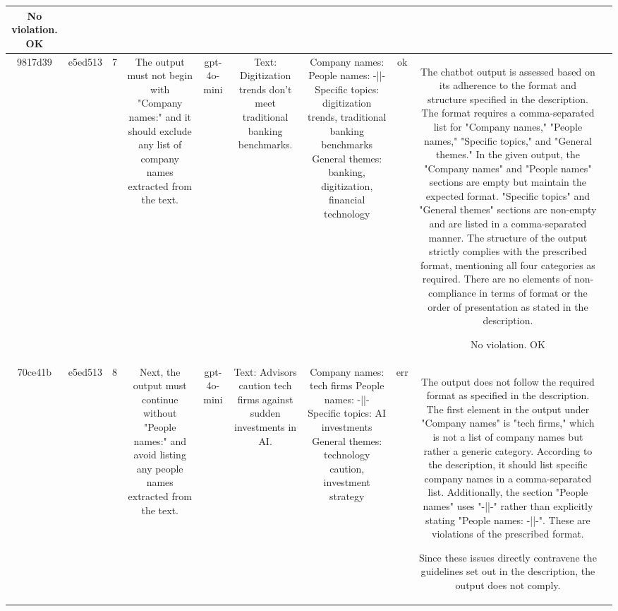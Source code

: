 \begin{table}[h!]
\begin{tabular}{|c|c|c|c|c|c|c|c|c|c|}
No violation.
OK & \\
\hline
9817d39 & e5ed513 & 7 & The output must not begin with "Company names:" and it should exclude any list of company names extracted from the text. & gpt-4o-mini & Text: Digitization trends don't meet traditional banking benchmarks. & Company names: 
People names: -||-
Specific topics: digitization trends, traditional banking benchmarks
General themes: banking, digitization, financial technology & ok & The chatbot output is assessed based on its adherence to the format and structure specified in the description. The format requires a comma-separated list for "Company names," "People names," "Specific topics," and "General themes." In the given output, the "Company names" and "People names" sections are empty but maintain the expected format. "Specific topics" and "General themes" sections are non-empty and are listed in a comma-separated manner. The structure of the output strictly complies with the prescribed format, mentioning all four categories as required. There are no elements of non-compliance in terms of format or the order of presentation as stated in the description.

No violation.
OK & \\
\hline
70ce41b & e5ed513 & 8 & Next, the output must continue without "People names:" and avoid listing any people names extracted from the text. & gpt-4o-mini & Text: Advisors caution tech firms against sudden investments in AI. & Company names: tech firms
People names: -||-
Specific topics: AI investments
General themes: technology caution, investment strategy & err & The output does not follow the required format as specified in the description. The first element in the output under "Company names" is "tech firms," which is not a list of company names but rather a generic category. According to the description, it should list specific company names in a comma-separated list. Additionally, the section "People names" uses "-||-" rather than explicitly stating "People names: -||-". These are violations of the prescribed format.

Since these issues directly contravene the guidelines set out in the description, the output does not comply.


\end{tabular}
\end{table}

